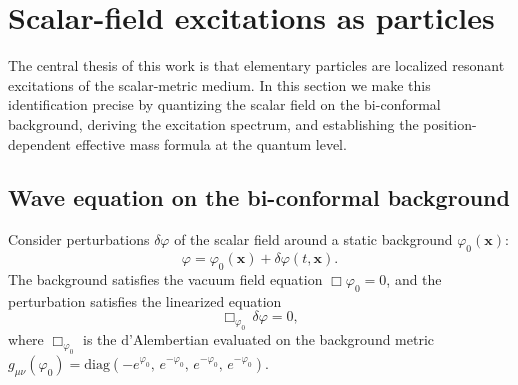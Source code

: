 \documentclass[aps,prd,onecolumn,superscriptaddress,nofootinbib,showpacs,12pt,notitlepage]{revtex4-2}
\begin{document}
\section{Scalar-field excitations as particles}\label{sec:excitations}

The central thesis of this work is that elementary particles are
localized resonant excitations of the scalar-metric medium.
In this section we make this identification precise by
quantizing the scalar field on the bi-conformal background,
deriving the excitation spectrum, and establishing the
position-dependent effective mass formula at the quantum level.

\subsection{Wave equation on the bi-conformal background}
\label{sec:wave_eq}

Consider perturbations $\delta\varphi$ of the scalar field around a
static background $\varphi_0(\mathbf{x})$:
\begin{equation}\label{eq:phi_decomp}
  \varphi = \varphi_0(\mathbf{x}) + \delta\varphi(t,\mathbf{x}).
\end{equation}
The background satisfies the vacuum field equation
$\Box\varphi_0 = 0$, and the perturbation satisfies the
linearized equation
\begin{equation}\label{eq:lin_wave}
  \Box_{\varphi_0}\,\delta\varphi = 0,
\end{equation}
where $\Box_{\varphi_0}$ is the d'Alembertian evaluated on
the background metric
$g_{\mu\nu}(\varphi_0) =
\mathrm{diag}(-e^{\varphi_0},\,e^{-\varphi_0},\,
e^{-\varphi_0},\,e^{-\varphi_0})$.
\end{document}
